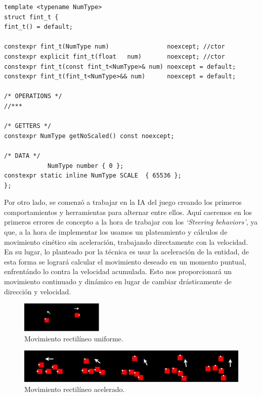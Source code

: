 \begin{lstlisting}[style=CodigoC++, caption={Entero coma fija},label=fint_t]
template <typename NumType>
struct fint_t {
fint_t() = default;

constexpr fint_t(NumType num)                noexcept; //ctor
constexpr explicit fint_t(float   num)       noexcept; //ctor
constexpr fint_t(const fint_t<NumType>& num) noexcept = default; 
constexpr fint_t(fint_t<NumType>&& num)      noexcept = default;

/* OPERATIONS */
//***

/* GETTERS */
constexpr NumType getNoScaled() const noexcept;

/* DATA */    
			NumType number { 0 };
constexpr static inline NumType SCALE  { 65536 };
};
\end{lstlisting}

Por otro lado, se comenzó a trabajar en la \ac{IA} del juego creando los primeros comportamientos
y herramientas para alternar entre ellos. Aquí caeremos en los primeros errores de concepto a la
hora de trabajar con los \textit{`Steering behaviors'}, ya que, a la hora de implementar los
usamos un plateamiento y cálculos de movimiento cinético sin aceleración, trabajando directamente 
con la velocidad.\\
En su lugar, lo planteado por la técnica es usar la aceleración de la entidad, de esta forma se 
logrará calcular el movimiento deseado en un momento puntual, enfrentándo lo contra la velocidad 
acumulada. Esto nos proporcionará un movimiento continuado y dinámico en lugar de cambiar drásticamente de 
dirección y velocidad.

\begin{figure}[htb]
\centering
\includegraphics[width=0.35\textwidth]{imagenes/diario_desarrollo/mov1.png}
\caption{Movimiento rectilíneo uniforme.}
\label{fig:mru}
\end{figure} 

\begin{figure}[htb]
\centering
\includegraphics[width=1\textwidth]{imagenes/diario_desarrollo/mov2.png}
\caption{Movimiento rectilíneo acelerado.}
\label{fig:mra}
\end{figure} 

